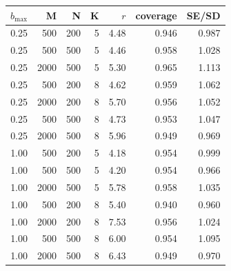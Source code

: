 \begin{tabular}{rrrrrrr}
\toprule
$b_{\max}$ & M & N & K & $r$ & coverage & SE/SD \\
\midrule
0.25 & 500 & 200 & 5 & 4.48 & 0.946 & 0.987 \\
0.25 & 500 & 500 & 5 & 4.46 & 0.958 & 1.028 \\
0.25 & 2000 & 500 & 5 & 5.30 & 0.965 & 1.113 \\
0.25 & 500 & 200 & 8 & 4.62 & 0.959 & 1.062 \\
0.25 & 2000 & 200 & 8 & 5.70 & 0.956 & 1.052 \\
0.25 & 500 & 500 & 8 & 4.73 & 0.953 & 1.047 \\
0.25 & 2000 & 500 & 8 & 5.96 & 0.949 & 0.969 \\
1.00 & 500 & 200 & 5 & 4.18 & 0.954 & 0.999 \\
1.00 & 500 & 500 & 5 & 4.20 & 0.954 & 0.966 \\
1.00 & 2000 & 500 & 5 & 5.78 & 0.958 & 1.035 \\
1.00 & 500 & 200 & 8 & 5.40 & 0.940 & 0.960 \\
1.00 & 2000 & 200 & 8 & 7.53 & 0.956 & 1.024 \\
1.00 & 500 & 500 & 8 & 6.00 & 0.954 & 1.095 \\
1.00 & 2000 & 500 & 8 & 6.43 & 0.949 & 0.970 \\
\bottomrule
\end{tabular}
